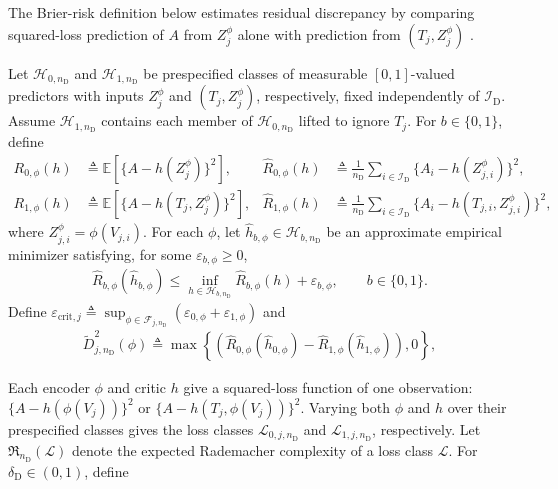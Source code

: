 The Brier-risk definition below estimates residual discrepancy by comparing squared-loss prediction of $A$ from $Z_j^\phi$ alone with prediction from $(T_j,Z_j^\phi)$ \citep{brier1950verification}.

\begin{definition}
\label{def:empirical-held-out-proxy-discrepancy}
\normalfont
 Let $\mathcal H_{0,n_{\mathrm D}}$ and $\mathcal H_{1,n_{\mathrm D}}$ be prespecified classes of measurable $[0,1]$-valued predictors with inputs $Z_j^\phi$ and $(T_j,Z_j^\phi)$, respectively, fixed independently of $\mathcal I_{\mathrm D}$. Assume $\mathcal H_{1,n_{\mathrm D}}$ contains each member of $\mathcal H_{0,n_{\mathrm D}}$ lifted to ignore $T_j$. For $b\in\{0,1\}$, define
\begin{align}
	R_{0,\phi}(h)&\triangleq\mathbb E[\{A-h(Z_j^\phi)\}^2],
	&
	\widehat R_{0,\phi}(h)&\triangleq\frac1{n_{\mathrm D}}\sum_{i\in\mathcal I_{\mathrm D}}\{A_i-h(Z_{j,i}^\phi)\}^2,\\
	R_{1,\phi}(h)&\triangleq\mathbb E[\{A-h(T_j,Z_j^\phi)\}^2],
	&
	\widehat R_{1,\phi}(h)&\triangleq\frac1{n_{\mathrm D}}\sum_{i\in\mathcal I_{\mathrm D}}\{A_i-h(T_{j,i},Z_{j,i}^\phi)\}^2,
	\label{eq:brier-risks}
\end{align}
where $Z_{j,i}^\phi=\phi(V_{j,i})$. For each $\phi$, let $\widehat h_{b,\phi}\in\mathcal H_{b,n_{\mathrm D}}$ be an approximate empirical minimizer satisfying, for some $\varepsilon_{b,\phi}\ge0$,
\begin{align}
	\widehat R_{b,\phi}(\widehat h_{b,\phi})
	\le
	\inf_{h\in\mathcal H_{b,n_{\mathrm D}}}\widehat R_{b,\phi}(h)
	+
	\varepsilon_{b,\phi},
	\qquad b\in\{0,1\}.
	\label{eq:approximate-critic-fits}
\end{align}
Define $\varepsilon_{\mathrm{crit},j}\triangleq\sup_{\phi\in\mathcal F_{j,n_{\mathrm D}}}(\varepsilon_{0,\phi}+\varepsilon_{1,\phi})$ and
\begin{align}
	\widetilde D_{j,n_{\mathrm D}}^2(\phi)
	\triangleq
	\max\left\{(
	\widehat R_{0,\phi}(\widehat h_{0,\phi})
	-
	\widehat R_{1,\phi}(\widehat h_{1,\phi})), 0
	\right\},
	\label{eq:empirical-discrepancy}
\end{align}
\end{definition}

Each encoder $\phi$ and critic $h$ give a squared-loss function of one observation: $\{A-h(\phi(V_j))\}^2$ or $\{A-h(T_j,\phi(V_j))\}^2$. Varying both $\phi$ and $h$ over their prespecified classes gives the loss classes $\mathcal L_{0,j,n_{\mathrm D}}$ and $\mathcal L_{1,j,n_{\mathrm D}}$, respectively. Let $\mathfrak R_{n_{\mathrm D}}(\mathcal L)$ denote the expected Rademacher complexity of a loss class $\mathcal L$. For $\delta_{\mathrm D}\in(0,1)$, define

